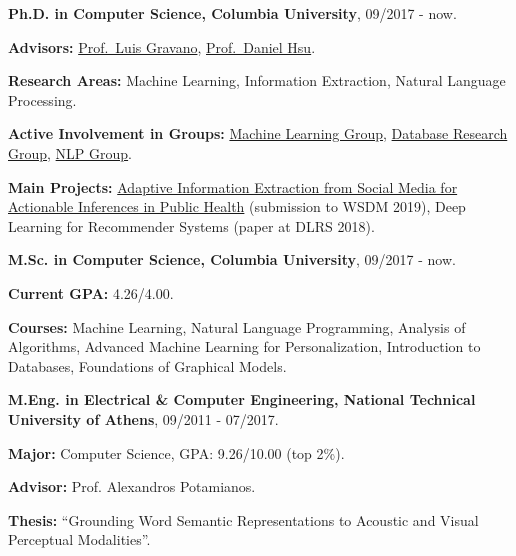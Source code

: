 \documentclass[letterpaper]{article}
\renewenvironment{itemize}{
  \begin{list}{}{
    \setlength{\leftmargin}{1.5em}
  }
}{
  \end{list}
}
\begin{document}
\begin{itemize}
  \item
    \textbf{Ph.D. in Computer Science, Columbia University}, 
     09/2017 - now.
     \begin{itemize}
         \item     
         \textbf{Advisors:} \href{http://www.cs.columbia.edu/~gravano/}{Prof.~Luis Gravano}, \href{http://www.cs.columbia.edu/~djhsu/}{Prof.~Daniel Hsu}.
         \item 
         \textbf{Research Areas:} Machine Learning, Information Extraction, Natural Language Processing.
        \item 
            \textbf{Active Involvement in Groups:} %
             \href{http://www.cs.columbia.edu/areas/machine/}{Machine Learning Group}, \href{https://cudbg.github.io/}{Database Research Group}, \href{http://www.cs.columbia.edu/nlp/index.cgi}{NLP Group}.
        \item 
            \textbf{Main Projects:} \href{http://publichealth.cs.columbia.edu/}{Adaptive Information Extraction from Social Media for Actionable Inferences in Public Health} (submission to WSDM 2019), Deep Learning for Recommender Systems (paper at DLRS 2018). 

     \end{itemize}
     
    \item 
        \textbf{M.Sc. in Computer Science, Columbia University}, 09/2017 - now.
        \begin{itemize}
            \item \textbf{Current GPA:} 4.26/4.00.
            \item \textbf{Courses:} Machine Learning, Natural Language Programming, Analysis of Algorithms, Advanced Machine Learning for Personalization, Introduction to Databases, Foundations of Graphical Models. 

        \end{itemize}
  \item
    \textbf{M.Eng. in Electrical \& Computer Engineering, National Technical University of Athens}, 09/2011 - 07/2017.
    \begin{itemize}
        \item \textbf{Major:} Computer Science, GPA: 9.26/10.00 (top 2\%).
        \item \textbf{Advisor:} Prof. Alexandros Potamianos.
        \item \textbf{Thesis:} ``Grounding Word Semantic Representations to Acoustic and Visual Perceptual Modalities''.
    \end{itemize}



\end{itemize}
\end{document}
